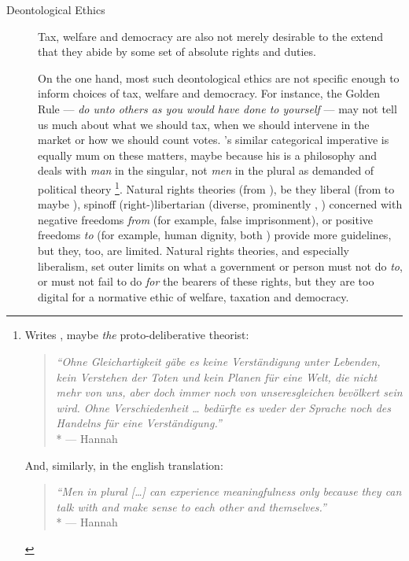 \begin{description}
	\item[Deontological Ethics \label{itm:deontological}] 
	Tax, welfare and democracy are also not merely desirable to the extend that they abide by some set of absolute rights and duties. 
	
	On the one hand, most such deontological ethics are not specific enough to inform choices of tax, welfare and democracy. 
	For instance, the Golden Rule --- \emph{do unto others as you would have done to yourself} --- may not tell us much about what we should tax, when we should intervene in the market or how we should count votes. 
	\citeauthor{Kant1781}'s similar categorical imperative is equally mum on these matters, maybe because his is a philosophy and %
	deals with \emph{man} in the singular, not \emph{men} in the plural as \citeauthor{Arendt1958} demanded of political theory
	\footnote{
		Writes \citeauthor{Arendt1958}, maybe \emph{the} proto-deliberative theorist: 
		\begin{quote}
			\emph{``Ohne Gleichartigkeit g\"abe es keine Verst\"andigung unter Lebenden, kein Verstehen der Toten und kein Planen f\"ur eine Welt, die nicht mehr von uns, aber doch immer noch von unseresgleichen bev\"olkert sein wird. Ohne Verschiedenheit … bed\"urfte es weder der Sprache noch des Handelns für eine Verst\"andigung.''}\\*
			--- Hannah \citet{Arendt1958} %
		\end{quote}
		And, similarly, in the english translation:
		\begin{quote}
			\emph{``Men in plural [\ldots] can experience meaningfulness only because they can talk with and make sense to each other and themselves.''}\\*
			--- Hannah \citet[Prologue]{Arendt1958} %
		\end{quote}
	}.
	Natural rights theories (from \citeauthor{Grotius1625}), be they liberal (from \citealt{Locke1689a} to maybe \citealt{Rawls-1993-aa}), spinoff (right-)libertarian (diverse, prominently \citealt{Hayek1944}, \citealt{Nozick1974}) concerned with negative freedoms \emph{from} (for example, false imprisonment), or positive freedoms \emph{to} (for example, human dignity, both \citealt{Berlin1969}) provide more guidelines, but they, too, are limited.
	Natural rights theories, and especially liberalism, set outer limits on what a government or person must not do \emph{to}, or must not fail to do \emph{for} the bearers of these rights, but they are too digital for a normative ethic of welfare, taxation and democracy. 

\end{description}
